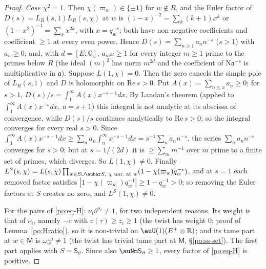 \documentclass[10pt]{amsart}
\theoremstyle{definition}
\theoremstyle{remark}
\newcommand{\R}{\mathbb R}
\newcommand{\Q}{\mathbb Q}
\begin{document}
\begin{proof}
\emph{Case $\chi^2=1$.} Then $\chi(\varpi_w)\in\{\pm1\}$ for $w\notin R$, and the Euler factor of
$D(s)=L_R(s,1)L_R(s,\chi)$ at $w$ is $(1-x)^{-2}=\sum_k(k+1)x^k$ or $(1-x^2)^{-1}=\sum_kx^{2k}$, with
$x=q_w^{-s}$; both have non-negative coefficients and coefficient $\ge1$ at every even power. Hence
$D(s)=\sum_{n\ge1}a_nn^{-s}$ ($s>1$) with $a_n\ge0$, and, with $d=[E:\Q]$, $a_{m^{2d}}\ge1$ for every
integer $m\ge1$ prime to the primes below $R$ (the ideal $(m)^2$ has norm $m^{2d}$ and the coefficient of
$\mathrm N\mathfrak a^{-s}$ is multiplicative in $\mathfrak a$). Suppose $L(1,\chi)=0$. Then the zero
cancels the simple pole of $L_R(s,1)$ and $D$ is holomorphic on $\mathrm{Re}\,s>0$. Put
$A(x)=\sum_{n\le x}a_n\ge0$; for $s>1$, $D(s)/s=\int_1^\infty A(x)x^{-s-1}dx$. By Landau's theorem
\cite[\S15.1, Lemma~15.1]{MV} (applied to $\int_1^\infty A(x)x^{-u}dx$, $u=s+1$) this integral is not
analytic at its abscissa of convergence, while $D(s)/s$ continues analytically to $\mathrm{Re}\,s>0$;
so the integral converges for every real $s>0$. Since $\int_1^\infty A(x)x^{-s-1}dx\ge\sum_na_n\int_n^\infty
x^{-s-1}dx=s^{-1}\sum_na_nn^{-s}$, the series $\sum_na_nn^{-s}$ converges for $s>0$; but at $s=1/(2d)$
it is $\ge\sum_{m}m^{-1}$ over $m$ prime to a finite set of primes, which diverges. So $L(1,\chi)\ne0$. Finally
$L^S(s,\chi)=L(s,\chi)\prod_{w\in S\cup\aubar S,\ \chi\text{ unr.\ at }w}(1-\chi(\varpi_w)q_w^{-s})$,
and at $s=1$ each removed factor satisfies $|1-\chi(\varpi_w)q_w^{-1}|\ge1-q_w^{-1}>0$; so removing
the Euler factors at $S$ creates no zero, and $L^S(1,\chi)\ne0$.

For the pairs of \eqref{po:eq-H}: $\nu_i\vartheta^{s_i}\ne1$, for two independent reasons. Its weight
is that of $\nu_i$, namely $-c$ with $c(\tau)\ge z_i\ge1$ (the twist has weight $0$; proof of
Lemma~\ref{po:Hratio}), so it is non-trivial on $\auU(1)(E^+\otimes\R)$; and its tame part at
$w\in\mathsf M$ is $\omega_w^{\pm j}\ne1$ (the twist has trivial tame part at $\mathsf M$,
\S\ref{po:ss-set}). The first part applies with $S=\mathsf S_\vartheta$. Since also $\auNm\mathsf S_\vartheta\ge1$, every
factor of \eqref{po:eq-H} is positive.
\end{proof}
\end{document}
